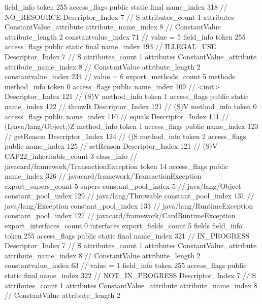 {{{{{{{				}
				}
			}
			field_info {
				token	255
				access_flags	public static final
				name_index	318		// NO_RESOURCE
				Descriptor_Index	7		// S
				attributes_count	1
				attributes {
				ConstantValue_attribute {
					attribute_name_index	8		// ConstantValue
					attribute_length	2
					constantvalue_index	71		// value = 5
				}
				}
			}
			field_info {
				token	255
				access_flags	public static final
				name_index	193		// ILLEGAL_USE
				Descriptor_Index	7		// S
				attributes_count	1
				attributes {
				ConstantValue_attribute {
					attribute_name_index	8		// ConstantValue
					attribute_length	2
					constantvalue_index	234		// value = 6
				}
				}
			}
			}
			export_methods_count	5
			methods {
				method_info {
					token	0
					access_flags	public
					name_index	109		// <init>
					Descriptor_Index	121		// (S)V
				}
				method_info {
					token	1
					access_flags	public static
					name_index	122		// throwIt
					Descriptor_Index	121		// (S)V
				}
				method_info {
					token	0
					access_flags	public
					name_index	110		// equals
					Descriptor_Index	111		// (Ljava/lang/Object;)Z
				}
				method_info {
					token	1
					access_flags	public
					name_index	123		// getReason
					Descriptor_Index	124		// ()S
				}
				method_info {
					token	2
					access_flags	public
					name_index	125		// setReason
					Descriptor_Index	121		// (S)V
				}
			}
			CAP22_inheritable_count	3
		}
		class_info {		// javacard/framework/TransactionException
			token	14
			access_flags	public
			name_index	326		// javacard/framework/TransactionException
			export_supers_count	5
			supers {
				constant_pool_index	5		// java/lang/Object
				constant_pool_index	129		// java/lang/Throwable
				constant_pool_index	131		// java/lang/Exception
				constant_pool_index	133		// java/lang/RuntimeException
				constant_pool_index	127		// javacard/framework/CardRuntimeException
			}
			export_interfaces_count	0
			interfaces {
			}
			export_fields_count	5
			fields {
			field_info {
				token	255
				access_flags	public static final
				name_index	321		// IN_PROGRESS
				Descriptor_Index	7		// S
				attributes_count	1
				attributes {
				ConstantValue_attribute {
					attribute_name_index	8		// ConstantValue
					attribute_length	2
					constantvalue_index	63		// value = 1
				}
				}
			}
			field_info {
				token	255
				access_flags	public static final
				name_index	322		// NOT_IN_PROGRESS
				Descriptor_Index	7		// S
				attributes_count	1
				attributes {
				ConstantValue_attribute {
					attribute_name_index	8		// ConstantValue
					attribute_length	2
}}}}}}}
